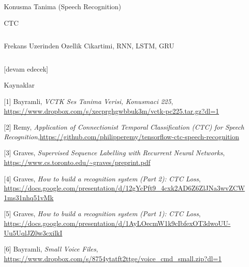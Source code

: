 \documentclass[12pt,fleqn]{article}\usepackage{../../common}
\begin{document}
Konusma Tanima (Speech Recognition)

CTC

\inputminted[fontsize=\footnotesize]{python}{train_vctk.py}

Frekans Uzerinden Ozellik Cikartimi, RNN, LSTM, GRU

\inputminted[fontsize=\footnotesize]{python}{speech1.py}


[devam edecek]



Kaynaklar

[1] Bayramli, {\em VCTK Ses Tanima Verisi, Konusmaci 225}, \url{https://www.dropbox.com/s/xecprghgwbbuk3m/vctk-pc225.tar.gz?dl=1}

[2] Remy, {\em Application of Connectionist Temporal Classification (CTC) for Speech Recognition},\url{https://github.com/philipperemy/tensorflow-ctc-speech-recognition}

[3] Graves, {\em Supervised Sequence Labelling with Recurrent Neural Networks}, \url{https://www.cs.toronto.edu/~graves/preprint.pdf}

[4] Graves, {\em How to build a recognition system (Part 2): CTC Loss}, \url{https://docs.google.com/presentation/d/12gYcPft9_4cxk2AD6Z6ZlJNa3wvZCW1ms31nhq51vMk}

[5] Graves, {\em How to build a recognition system (Part 1): CTC Loss}, \url{https://docs.google.com/presentation/d/1AyLOecmW1k9cIbfexOT3dwoUU-Uu5UqlJZ0w3cxilkI}

[6] Bayramli, {\em Small Voice Files}, \url{https://www.dropbox.com/s/8754ytatft2ttge/voice_cmd_small.zip?dl=1}
\end{document}
